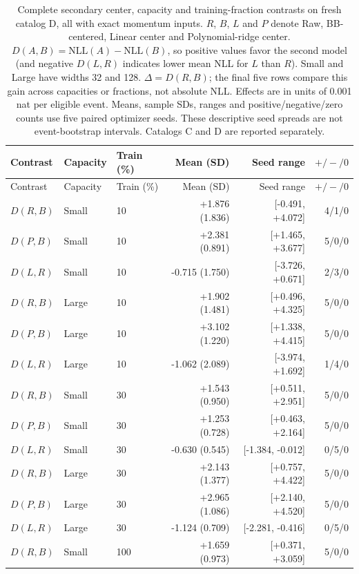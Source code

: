 \begingroup
\small
\setlength{\tabcolsep}{3pt}
\begin{longtable}{lllrrr}
\caption{Complete secondary center, capacity and training-fraction contrasts on fresh catalog D, all with exact momentum inputs. $R$, $B$, $L$ and $P$ denote Raw, BB-centered, Linear center and Polynomial-ridge center. $D(A,B)=\mathrm{NLL}(A)-\mathrm{NLL}(B)$, so positive values favor the second model (and negative $D(L,R)$ indicates lower mean NLL for $L$ than $R$). Small and Large have widths 32 and 128. $\Delta=D(R,B)$; the final five rows compare this gain across capacities or fractions, not absolute NLL. Effects are in units of 0.001 nat per eligible event. Means, sample SDs, ranges and positive/negative/zero counts use five paired optimizer seeds. These descriptive seed spreads are not event-bootstrap intervals. Catalogs C and D are reported separately.}\label{tab:editorial-secondary-current-D}\\
\toprule Contrast & Capacity & Train (\%) & Mean (SD) & Seed range & $+/-/0$\\ \midrule \endfirsthead
\toprule Contrast & Capacity & Train (\%) & Mean (SD) & Seed range & $+/-/0$\\ \midrule \endhead
$D(R,B)$ & Small & 10 & +1.876 (1.836) & [-0.491, +4.072] & 4/1/0\\
$D(P,B)$ & Small & 10 & +2.381 (0.891) & [+1.465, +3.677] & 5/0/0\\
$D(L,R)$ & Small & 10 & -0.715 (1.750) & [-3.726, +0.671] & 2/3/0\\
\midrule
$D(R,B)$ & Large & 10 & +1.902 (1.481) & [+0.496, +4.325] & 5/0/0\\
$D(P,B)$ & Large & 10 & +3.102 (1.220) & [+1.338, +4.415] & 5/0/0\\
$D(L,R)$ & Large & 10 & -1.062 (2.089) & [-3.974, +1.692] & 1/4/0\\
\midrule
$D(R,B)$ & Small & 30 & +1.543 (0.950) & [+0.511, +2.951] & 5/0/0\\
$D(P,B)$ & Small & 30 & +1.253 (0.728) & [+0.463, +2.164] & 5/0/0\\
$D(L,R)$ & Small & 30 & -0.630 (0.545) & [-1.384, -0.012] & 0/5/0\\
\midrule
$D(R,B)$ & Large & 30 & +2.143 (1.377) & [+0.757, +4.422] & 5/0/0\\
$D(P,B)$ & Large & 30 & +2.965 (1.086) & [+2.140, +4.520] & 5/0/0\\
$D(L,R)$ & Large & 30 & -1.124 (0.709) & [-2.281, -0.416] & 0/5/0\\
\midrule
$D(R,B)$ & Small & 100 & +1.659 (0.973) & [+0.371, +3.059] & 5/0/0\\

\end{longtable}
